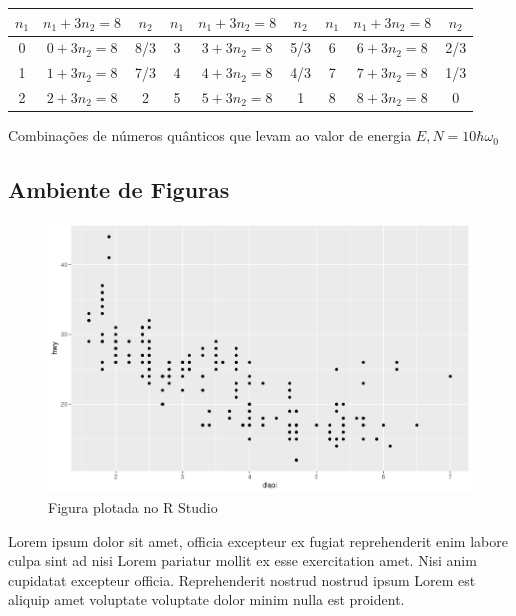 \begin{quadro}[!ht]
  \centering
  \begin{tabular}{|c|c|c|c|c|c|c|c|c|}
	 \hline
	 \textbf{$n_1$} & \textbf{$n_1+3n_2=8$} & \textbf{$n_2$} & \textbf{$n_1$} & \textbf{$n_1+3n_2=8$} & \textbf{$n_2$} & \textbf{$n_1$} & \textbf{$n_1+3n_2=8$} & \textbf{$n_2$} \\ \hline
	 0              & $0+3n_2=8$            & 8/3            & 3              & $3+3n_2=8$            & 5/3            & 6              & $6+3n_2=8$            & 2/3            \\ \hline
	 1              & $1+3n_2=8$            & 7/3            & 4              & $4+3n_2=8$            & 4/3            & 7              & $7+3n_2=8$            & 1/3            \\ \hline
	 2              & $2+3n_2=8$            & 2              & 5              & $5+3n_2=8$            & 1              & 8              & $8+3n_2=8$            & 0              \\ \hline
  \end{tabular}
  \caption{Combinações de números quânticos que levam ao valor de energia $E,N=10\hbar\omega_0$}
  \label{qua:numeros-quanticos}
\end{quadro}

\subsection{Ambiente de Figuras} %
\label{sub:Ambiente de Figuras}
\setlength\intextsep{0pt}
\begin{figure}
  \centering
  \includegraphics[width=.45\textwidth]{assets/Rplot.png}

  \label{fig:rplot}
  \caption{Figura plotada no R Studio}
\end{figure}
Lorem ipsum dolor sit amet, officia excepteur ex fugiat reprehenderit enim labore culpa sint ad nisi Lorem pariatur mollit ex esse exercitation amet. Nisi anim cupidatat excepteur officia. Reprehenderit nostrud nostrud ipsum Lorem est aliquip amet voluptate voluptate dolor minim nulla est proident.


